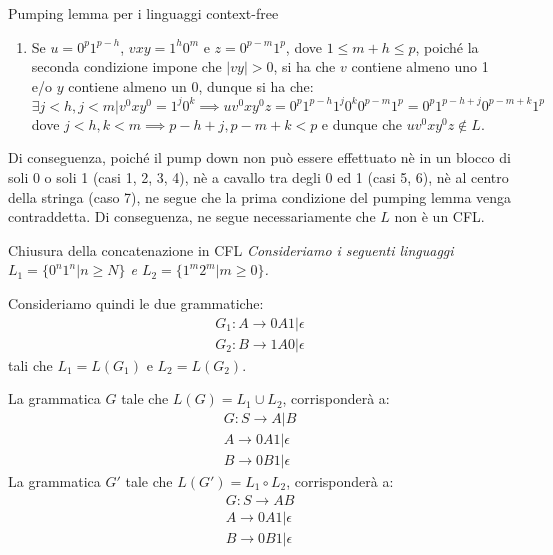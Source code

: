\begin{Example}{Pumping lemma per i linguaggi context-free}{}
\begin{enumerate}
    \item Se $u = 0^p1^{p-h}$, $vxy = 1^h0^m$ e $z = 0^{p-m}1^p$, dove $1 \leq m + h \leq p$, poiché la seconda condizione impone che $|vy| > 0$, si ha che $v$ contiene almeno uno 1 e/o $y$ contiene almeno un 0, dunque si ha che:
    \begin{equation*}
        \exists j < h, j < m | v^0xy^0 = 1^j0^k \implies uv^0xy^0z = 0^p1^{p-h}1^j0^k0^{p-m}1^p = 0^p1^{p-h+j}0^{p-m+k}1^p
    \end{equation*}
    dove $j < h, k < m \implies p-h+j, p-m+k < p$ e dunque che $uv^0xy^0z \notin L$.
\end{enumerate}

Di conseguenza, poiché il pump down non può essere effettuato nè in un blocco di soli 0 o soli 1 (casi 1, 2, 3, 4), nè a cavallo tra degli 0 ed 1 (casi 5, 6), nè al centro della stringa (caso 7), ne segue che la prima condizione del pumping lemma venga contraddetta. Di conseguenza, ne segue necessariamente che $L$ non è un CFL.
\end{Example}

\begin{Example}{Chiusura della concatenazione in CFL}{}
\textit{Consideriamo i seguenti linguaggi $L_1 = \{0^n1^n| n\geq N\}$ e $L_2 = \{1^m2^m | m\geq0\}$.}

Consideriamo quindi le due grammatiche:
\begin{gather*}
G_1 : A \to 0A1 | \epsilon\\
G_2 : B \to 1A0 | \epsilon  
\end{gather*}
tali che $L_1 = L(G_1)$ e $L_2 = L(G_2)$.

La grammatica $G$ tale che $L(G) = L_1\cup L_2$, corrisponderà a:
\begin{gather*}
G : S \to A | B\\
A \to 0A1 | \epsilon\\
B \to 0B1 | \epsilon 
\end{gather*}
La grammatica $G'$ tale che $L(G') = L_1\circ L_2$, corrisponderà a:
\begin{gather*}
G : S \to AB\\
A \to 0A1 | \epsilon\\
B \to 0B1 | \epsilon
\end{gather*}
\end{Example}

